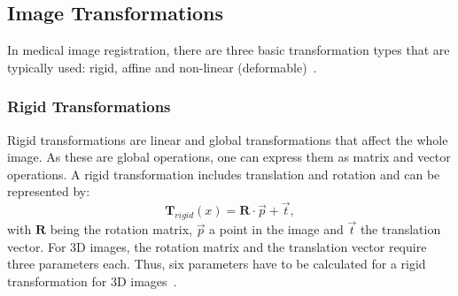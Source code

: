 \subsection{Image Transformations} \label{SubSec:ImageTransformations}
In medical image registration, there are three basic transformation types that are typically used: rigid, affine and non-linear (deformable)~\cite{Strittmatter2023}.

\subsubsection{Rigid Transformations}
Rigid transformations are linear and global transformations that affect the whole image. As these are global operations, one can express them as matrix and vector operations. A rigid transformation includes translation and rotation and can be represented by:
\begin{equation}
	\mathbf{T}_{rigid} (x) = \mathbf{R} \cdot \overrightarrow{p} + \overrightarrow{t},
\end{equation}
with $\mathbf{R}$ being the rotation matrix, $\overrightarrow{p}$ a point in the image and $\overrightarrow{t}$ the translation vector.  For 3D images, the rotation matrix and the translation vector require three parameters each. Thus, six parameters have to be calculated for a rigid transformation for 3D images~\cite{Strittmatter2023}.

